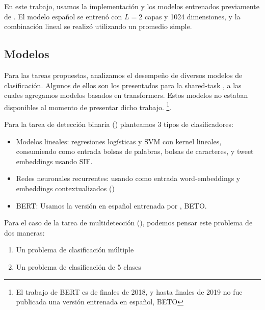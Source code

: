 %

En este trabajo, usamos la implementación y los modelos entrenados previamente de \cite{che-EtAl:2018:K18-2}. El modelo español se entrenó con $L = 2 $ capas y 1024 dimensiones, y la combinación lineal se realizó utilizando un promedio simple.

\subsection{Modelos}

Para las tareas propuestas, analizamos el desempeño de diversos modelos de clasificación. Algunos de ellos son los presentados para la shared-task \hateval{}, a las cuales agregamos modelos basados en transformers. Estos modelos no estaban disponibles al momento de presentar dicho trabajo. \footnote{El trabajo de BERT\cite{devlin2018bert} es de finales de 2018, y hasta finales de 2019 no fue publicada una versión entrenada en español, BETO}.

Para la tarea de detección binaria (\subtaska{}) planteamos 3 tipos de clasificadores:

\begin{itemize}
    \item Modelos lineales: regresiones logísticas y SVM con kernel lineales, consumiendo como entrada bolsas de palabras, bolsas de caracteres, y tweet embeddings usando SIF.
    \item Redes neuronales recurrentes: usando como entrada word-embeddings y embeddings contextualizados (\elmo{})
    \item BERT: Usamos la versión en español entrenada por \citet{canete2020spanish}, BETO.
\end{itemize}

Para el caso de la tarea de multidetección (\subtaskb{}), podemos pensar este problema de dos maneras:

\begin{enumerate}
    \item Un problema de clasificación múltiple
    \item Un problema de clasificación de 5 clases
\end{enumerate}

